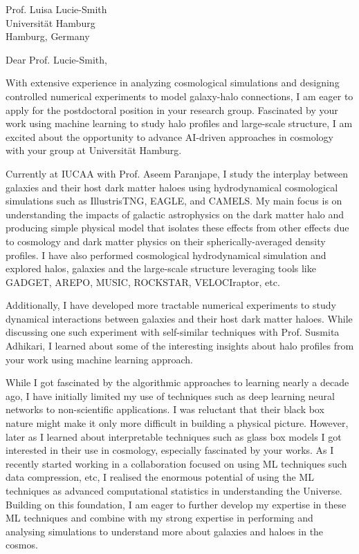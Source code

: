 \documentclass[11pt]{letter}
\begin{document}
\begin{letter}{Prof. Luisa Lucie-Smith \\ Universität Hamburg \\ Hamburg, Germany}

\opening{Dear Prof. Lucie-Smith,}

With extensive experience in analyzing cosmological simulations and designing controlled numerical experiments to model galaxy-halo connections, I am eager to apply for the postdoctoral position in your research group. Fascinated by your work using machine learning to study halo profiles and large-scale structure, I am excited about the opportunity to advance AI-driven approaches in cosmology with your group at Universität Hamburg.

Currently at IUCAA with Prof. Aseem Paranjape, I study the interplay between galaxies and their host dark matter haloes using hydrodynamical cosmological simulations such as IllustrisTNG, EAGLE, and CAMELS. My main focus is on understanding the impacts of galactic astrophysics on the dark matter halo and producing simple physical model that isolates these effects from other effects due to cosmology and dark matter physics on their spherically-averaged density profiles. I have also performed cosmological hydrodynamical simulation and explored halos, galaxies and the large-scale structure leveraging tools like GADGET, AREPO, MUSIC, ROCKSTAR, VELOCIraptor, etc.

Additionally, I have developed more tractable numerical experiments to study dynamical interactions between galaxies and their host dark matter haloes. While discussing one such experiment with self-similar techniques with Prof. Susmita Adhikari, I learned about some of the interesting insights about halo profiles from your work using machine learning approach. 

While I got fascinated by the algorithmic approaches to learning nearly a decade ago, I have initially limited my use of techniques such as deep learning neural networks to non-scientific applications. I was reluctant that their black box nature might make it only more difficult in building a physical picture. However, later as I learned about interpretable techniques such as glass box models I got interested in their use in cosmology, especially fascinated by your works. As I recently started working in a collaboration focused on using ML techniques such data compression, etc, I realised the enormous potential of using the ML techniques as advanced computational statistics in understanding the Universe. Building on this foundation, I am eager to further develop my expertise in these ML techniques and combine with my strong expertise in performing and analysing simulations to understand more about galaxies and haloes in the cosmos.


\end{letter}
\end{document}
